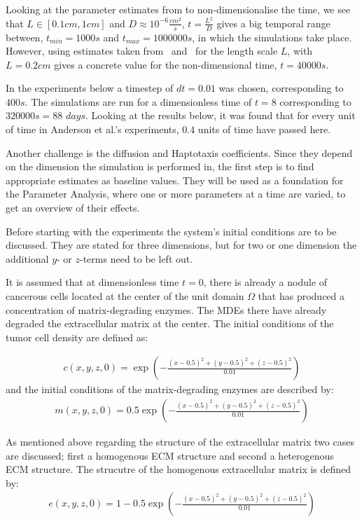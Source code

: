 Looking at the parameter estimates from \cite{anderson_mathematical_2000} to non-dimensionalise the time, we see that $L \in [0.1cm,1cm]$ and $D\approx 10^{-6}\frac{cm^2}{s}$, $t = \frac{L^2}{D}$ gives a big temporal range between, $t_{min} = 1000s$ and $t_{max} = 1000000s$, in which the simulations take place. However, using estimates taken from~\cite{STEPHANOU200696} and~\cite{franssen_mathematical_2019} for the length scale $L$, with $L=0.2cm$ gives a concrete value for the non-dimensional time, $t=40000s$.

In the experiments below a timestep of $dt=0.01$ was chosen, corresponding to $400s$. The simulations are run for a dimensionless time of $t=8$ corresponding to $320000s=88$ $days$. Looking at the results below, it was found that for every unit of time in Anderson et al.'s experiments, $0.4$ units of time have passed here.

Another challenge is the diffusion and Haptotaxis coefficients. Since they depend on the dimension the simulation is performed in, the first step is to find appropriate estimates as baseline values. They will be used as a foundation for the Parameter Analysis, where one or more parameters at a time are varied, to get an overview of their effects. 

Before starting with the experiments the system's initial conditions are to be discussed. They are stated for three dimensions, but for two or one dimension the additional $y$- or $z$-terms need to be left out.

It is assumed that at dimensionless time $t=0$, there is already a nodule of cancerous cells located at the center of the unit domain $\Omega$ that has produced a concentration of matrix-degrading enzymes. The MDEs there have already degraded the extracellular matrix at the center. The initial conditions of the tumor cell density are defined as:

\begin{align*}
    c(x,y,z,0)= \exp(-\frac{(x-0.5)^2+(y-0.5)^2+(z-0.5)^2}{0.01})
\end{align*}
and the initial conditions of the matrix-degrading enzymes are described by:
\begin{align*}
    m(x,y,z,0) = 0.5 \exp(-\frac{(x-0.5)^2+(y-0.5)^2+(z-0.5)^2}{0.01})
\end{align*}

As mentioned above regarding the structure of the extracellular matrix two cases are discussed; first a homogenous ECM structure and second a heterogenous ECM structure.
The strucutre of the homogenous extracellular matrix is defined by:
\begin{align*}
    e(x,y,z,0) = 1 - 0.5 \exp(-\frac{(x-0.5)^2+(y-0.5)^2+(z-0.5)^2}{0.01})
\end{align*}

